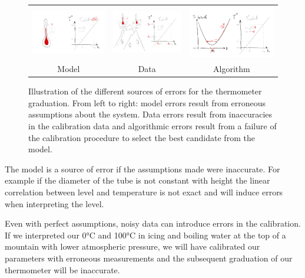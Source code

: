 \begin{bibunit}
\begin{figure}
\begin{tabular}{c|c|c}
     \hspace{-.15\linewidth}\includegraphics[width=.4\linewidth]{Introduction/pics/model_err_w_source.png}  &
     \includegraphics[width=.4\linewidth]{Introduction/pics/data_err_w_source.png} &
     \includegraphics[width=.4\linewidth]{Introduction/pics/optim_err_w_source.png} \\
     \hspace{-.15\linewidth}Model &  Data &  Algorithm \\
\end{tabular}
    \centering
    \caption{Illustration of the different sources of errors for the thermometer graduation. From left to right: model errors result from erroneous assumptions about the system. Data errors result from inaccuracies in the calibration data and algorithmic errors result from a failure of the calibration procedure to select the best candidate from the model.}
    \label{fig:err_sources}
\end{figure}
 The model is a source of error if the assumptions made were inaccurate. For example if the diameter of the tube is not constant with height the linear correlation between level and temperature is not exact and will induce errors when interpreting the level.

 Even with perfect assumptions, noisy data can introduce errors in the calibration. If we interpreted our 0°C and 100°C in icing and boiling water at the top of a mountain with lower atmospheric pressure, we will have calibrated our parameters with erroneous measurements and the subsequent graduation of our thermometer will be inaccurate.


\end{bibunit}
